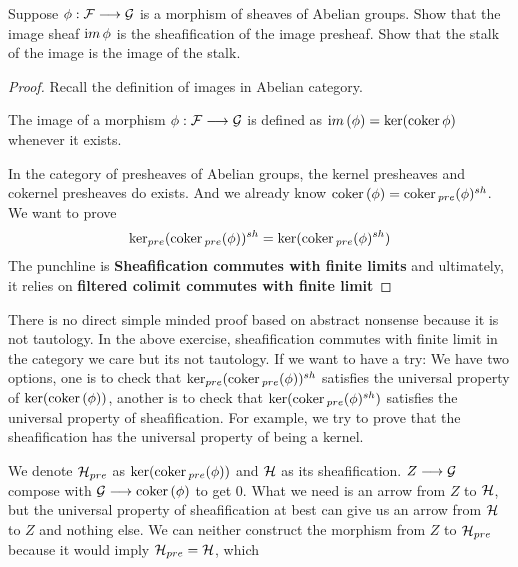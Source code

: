 \documentclass[11pt,fleqn]{book} %
\begin{document}
\begin{exr}
Suppose $\phi:{\cal F}\longrightarrow {\cal G}$ is a morphism of sheaves of Abelian groups. Show that the image sheaf ${\text im\thinspace} \phi$ is the sheafification of the image presheaf. Show that the stalk of the image is the image of the stalk.
\end{exr}
\begin{proof}
Recall the definition of images in Abelian category.

The image of a morphism $\phi : {\cal F} \longrightarrow {\cal G}$ is defined as ${\text im\thinspace}(\phi) = \ker(\text{coker\,} \phi)$ whenever it exists.

In the category of presheaves of Abelian groups, the kernel presheaves and cokernel presheaves do exists. And we already know $\text{coker\,}(\phi)=\text{coker\,}_{pre}(\phi)^{sh}$. We want to prove
$$
\ker_{pre}(\text{coker\,}_{pre}(\phi))^{sh}=\ker(\text{coker\,}_{pre}(\phi)^{sh})
$$
The punchline is \textbf{Sheafification commutes with finite limits} and ultimately, it relies on \textbf{filtered colimit commutes with finite limit}

\end{proof}
\begin{remark}
There is no direct simple minded proof based on abstract nonsense because it is not tautology. In the above exercise, sheafification commutes with finite limit in the category we care but its not tautology. If we want to have a try: We have two options, one is to check that $\ker_{pre}(\text{coker\,}_{pre}(\phi))^{sh}$ satisfies the universal property of $\ker(\text{coker\,}(\phi))$, another is to check that $\ker(\text{coker\,}_{pre}(\phi)^{sh})$ satisfies the universal property of sheafification. For example, we try to prove that the sheafification has the universal property of being a kernel.
\begin{center}
\end{center}
We denote ${\cal H}_{pre}$ as $\ker(\text{coker\,}_{pre}(\phi))$ and ${\cal H}$ as its sheafification.
$Z\longrightarrow {\cal G}$ compose with ${\cal G}\longrightarrow \text{coker\,}(\phi)$ to get $0$.
What we need is an arrow from $Z$ to ${\cal H}$, but the universal property of sheafification at best can give us an arrow from ${\cal H}$ to $Z$ and nothing else. We can neither construct the morphism from $Z$ to ${\cal H}_{pre}$ because it would imply ${\cal H}_{pre}={\cal H}$, which 
\end{remark}
\end{document}
